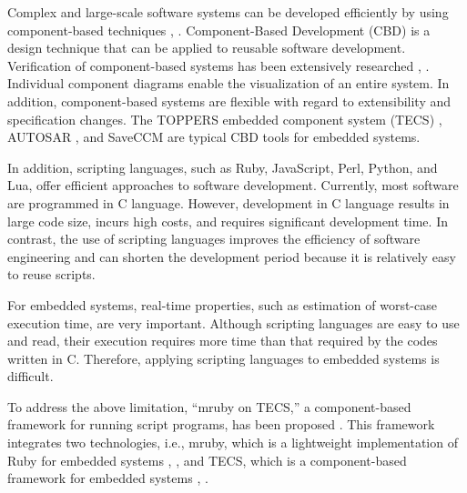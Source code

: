\documentclass{sig-alternate-05-2015}
\begin{document}
Complex and large-scale software systems can be developed efficiently by using component-based techniques \cite{par:Crnkovic}, \cite{par:CBD}.
Component-Based Development (CBD) is a design technique that can be applied to reusable software development.
Verification of component-based systems has been extensively researched \cite{par:Blaming}, \cite{par:Verification}.
Individual component diagrams enable the visualization of an entire system.
In addition, component-based systems are flexible with regard to extensibility and specification changes.
The TOPPERS embedded component system (TECS) \cite{par:TECS}, AUTOSAR \cite{url:AUTOSAR}, and SaveCCM \cite{par:SAVEapproach} are typical CBD tools for embedded systems.

In addition, scripting languages, such as Ruby, JavaScript, Perl, Python, and Lua, offer efficient approaches to software development.
Currently, most software are programmed in C language.
However, development in C language results in large code size, incurs high costs, and requires significant development time.
In contrast, the use of scripting languages improves the efficiency of software engineering and can shorten the development period because it is relatively easy to reuse scripts. 

For embedded systems, real-time properties, such as estimation of worst-case execution time, are very important.
Although scripting languages are easy to use and read, their execution requires more time than that required by the codes written in C.
Therefore, applying scripting languages to embedded systems is difficult.

To address the above limitation, ``mruby on TECS,'' a component-based framework for running script programs, has been proposed \cite{par:mrubyonTECS}.
This framework integrates two technologies, i.e., mruby, which is a lightweight implementation of Ruby for embedded systems \cite{par:mruby}, \cite{url:mruby}, and TECS, which is a component-based framework for embedded systems \cite{par:TECS}, \cite{url:TOPPERS}.
\end{document}
